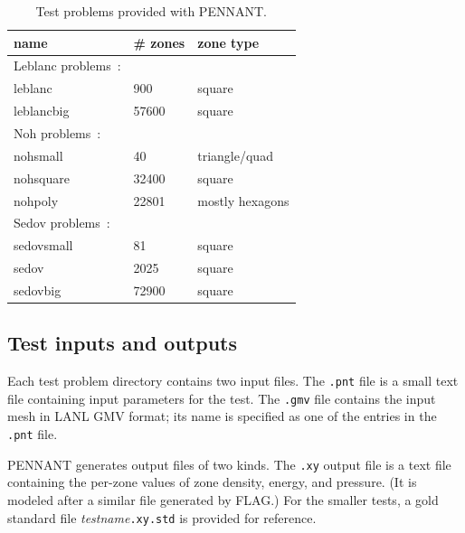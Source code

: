\documentclass[11pt,letterpaper]{article} %
\begin{document}
\begin{table}
\centering
\caption{Test problems provided with PENNANT.}
\label{tbl:tests}
\begin{tabular}{lll}
    \hline
    name & \# zones & zone type \\
    \hline
    Leblanc problems~\cite{leblanc}: \\
    leblanc    &   900 & square \\
    leblancbig & 57600 & square \\
    \hline
    Noh problems~\cite{noh}: \\
    nohsmall   &    40 & triangle/quad \\
    nohsquare  & 32400 & square \\
    nohpoly    & 22801 & mostly hexagons \\
    \hline
    Sedov problems~\cite{sedov}: \\
    sedovsmall &    81 & square \\
    sedov      &  2025 & square \\
    sedovbig   & 72900 & square \\
    \hline
\end{tabular}
\end{table}

\subsection{Test inputs and outputs}

Each test problem directory contains two input files.  The {\tt.pnt}
file is a small text file containing input parameters for the test.
The {\tt.gmv} file contains the input mesh in LANL GMV format; its name
is specified as one of the entries in the {\tt.pnt} file.

PENNANT generates output files of two kinds.  The {\tt.xy} output file
is a text file containing the per-zone values of zone density, energy,
and pressure.  (It is modeled after a similar file generated by FLAG.)
For the smaller tests, a gold standard file {\em testname}{\tt.xy.std}
is provided for reference.
\end{document}
